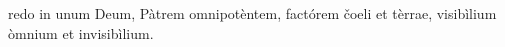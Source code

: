 redo in unum Deum, Pàtrem omnipotèntem, factórem čoeli et tèrrae, visibìlium òmnium et invisibìlium.
